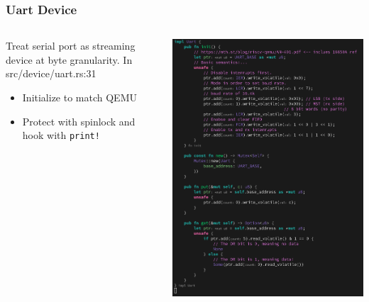 \documentclass{beamer}
\begin{document}
\begin{frame}[fragile]
  \frametitle{Uart Device}
  \begin{columns}
    \begin{column}{0.5\textwidth}
      Treat serial port as streaming device at byte granularity.
      In src/device/uart.rs:31
      \begin{itemize}
      \item Initialize to match QEMU\\
      \item Protect with spinlock and hook with \verb_print!_
      \end{itemize}
    \end{column}
    \begin{column}{0.5\textwidth}
      \includegraphics[width=\textwidth]{uart.png}
    \end{column}
  \end{columns}
\end{frame}
\end{document}
